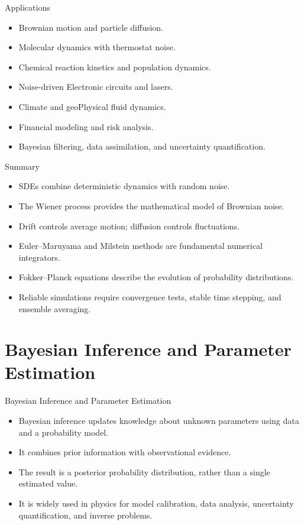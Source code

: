 \documentclass[a4paper, 10pt, onepage]{elegantbook}
\begin{document}
{\begin{frame}{Applications}
  \begin{itemize}
    \item Brownian motion and particle diffusion.
    \item Molecular dynamics with thermostat noise.
    \item Chemical reaction kinetics and population dynamics.
    \item Noise-driven Electronic circuits and lasers.
    \item Climate and geoPhysical fluid dynamics.
    \item Financial modeling and risk analysis.
    \item Bayesian filtering, data assimilation, and uncertainty quantification.
  \end{itemize}
\end{frame}

\begin{frame}{Summary}
  \begin{itemize}
    \item SDEs combine deterministic dynamics with random noise.
    \item The Wiener process provides the mathematical model of Brownian noise.
    \item Drift controls average motion; diffusion controls fluctuations.
    \item Euler--Maruyama and Milstein methods are fundamental numerical integrators.
    \item Fokker--Planck equations describe the evolution of probability distributions.
    \item Reliable simulations require convergence tests, stable time stepping, and ensemble averaging.
  \end{itemize}
\end{frame}

\newpage

\section{Bayesian Inference and Parameter Estimation}

\begin{frame}{Bayesian Inference and Parameter Estimation}
  \begin{itemize}
    \item Bayesian inference updates knowledge about unknown parameters using data and a probability model.
    \item It combines prior information with observational evidence.
    \item The result is a posterior probability distribution, rather than a single estimated value.
    \item It is widely used in physics for model calibration, data analysis, uncertainty quantification, and inverse 
problems.
  \end{itemize}
\end{frame}

}
\end{document}
